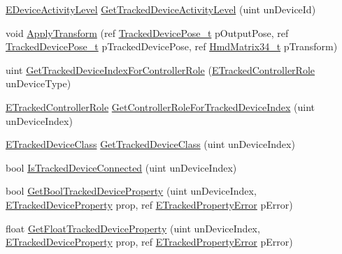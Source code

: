 \begin{DoxyCompactItemize}
\item 
\mbox{\hyperlink{namespace_valve_1_1_v_r_a44a7a02e482d63dc5e0c0851a2ad775e}{E\+Device\+Activity\+Level}} \mbox{\hyperlink{class_valve_1_1_v_r_1_1_c_v_r_system_a0daef57d1ec6478a14450cb05febca59}{Get\+Tracked\+Device\+Activity\+Level}} (uint un\+Device\+Id)
\item 
void \mbox{\hyperlink{class_valve_1_1_v_r_1_1_c_v_r_system_ae8763c74f425d9eec719a555ea3995fd}{Apply\+Transform}} (ref \mbox{\hyperlink{struct_valve_1_1_v_r_1_1_tracked_device_pose__t}{Tracked\+Device\+Pose\+\_\+t}} p\+Output\+Pose, ref \mbox{\hyperlink{struct_valve_1_1_v_r_1_1_tracked_device_pose__t}{Tracked\+Device\+Pose\+\_\+t}} p\+Tracked\+Device\+Pose, ref \mbox{\hyperlink{struct_valve_1_1_v_r_1_1_hmd_matrix34__t}{Hmd\+Matrix34\+\_\+t}} p\+Transform)
\item 
uint \mbox{\hyperlink{class_valve_1_1_v_r_1_1_c_v_r_system_a44fda444e868474cbc41dd2fc1fe8d81}{Get\+Tracked\+Device\+Index\+For\+Controller\+Role}} (\mbox{\hyperlink{namespace_valve_1_1_v_r_a7814f024ae1755837d784b5263e05792}{E\+Tracked\+Controller\+Role}} un\+Device\+Type)
\item 
\mbox{\hyperlink{namespace_valve_1_1_v_r_a7814f024ae1755837d784b5263e05792}{E\+Tracked\+Controller\+Role}} \mbox{\hyperlink{class_valve_1_1_v_r_1_1_c_v_r_system_ae337e057f5d2beb2993405773207d78a}{Get\+Controller\+Role\+For\+Tracked\+Device\+Index}} (uint un\+Device\+Index)
\item 
\mbox{\hyperlink{namespace_valve_1_1_v_r_aa1a3c2765fe53acb85372a57652c47a1}{E\+Tracked\+Device\+Class}} \mbox{\hyperlink{class_valve_1_1_v_r_1_1_c_v_r_system_ac397038d675df987d6da168edb72068d}{Get\+Tracked\+Device\+Class}} (uint un\+Device\+Index)
\item 
bool \mbox{\hyperlink{class_valve_1_1_v_r_1_1_c_v_r_system_aeba3d5d5d782b1a343ae1555b30c4c3f}{Is\+Tracked\+Device\+Connected}} (uint un\+Device\+Index)
\item 
bool \mbox{\hyperlink{class_valve_1_1_v_r_1_1_c_v_r_system_af4e5f993f956f6a825bafb95f8c1f680}{Get\+Bool\+Tracked\+Device\+Property}} (uint un\+Device\+Index, \mbox{\hyperlink{namespace_valve_1_1_v_r_ab060521ead7273986988fc4897e52482}{E\+Tracked\+Device\+Property}} prop, ref \mbox{\hyperlink{namespace_valve_1_1_v_r_aab6684f03930a2d2cf22ed66b437e47b}{E\+Tracked\+Property\+Error}} p\+Error)
\item 
float \mbox{\hyperlink{class_valve_1_1_v_r_1_1_c_v_r_system_a6695017d8f8b2e6492fc003f7910a49e}{Get\+Float\+Tracked\+Device\+Property}} (uint un\+Device\+Index, \mbox{\hyperlink{namespace_valve_1_1_v_r_ab060521ead7273986988fc4897e52482}{E\+Tracked\+Device\+Property}} prop, ref \mbox{\hyperlink{namespace_valve_1_1_v_r_aab6684f03930a2d2cf22ed66b437e47b}{E\+Tracked\+Property\+Error}} p\+Error)

\end{DoxyCompactItemize}
